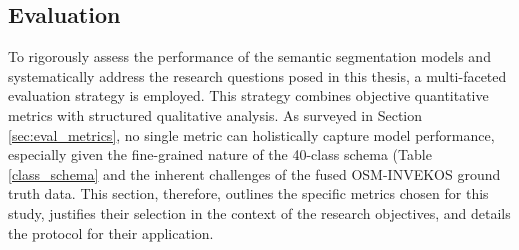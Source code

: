 \documentclass{report}
\begin{document}
\paragraph{ }
\subsection{Evaluation}
To rigorously assess the performance of the semantic segmentation models and systematically address the research questions posed in this thesis, a multi-faceted evaluation strategy is employed. This strategy combines objective quantitative metrics with structured qualitative analysis. As surveyed in Section \ref{sec:eval_metrics}, no single metric can holistically capture model performance, especially given the fine-grained nature of the 40-class schema (Table \ref{class_schema}  and the inherent challenges of the fused OSM-INVEKOS ground truth data. This section, therefore, outlines the specific metrics chosen for this study, justifies their selection in the context of the research objectives, and details the protocol for their application.
\end{document}
